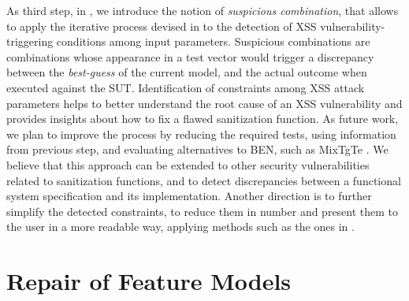 \begin{tikzborder}{\cite{Gargantini16:validation}}
\begin{tikzborder}{\cite{gargantini_combinatorial_2017}}
\begin{tikzborder}{\cite{garn2019}}
As third step, in \cite{garn2019}, we introduce the notion of \textit{suspicious combination}, that allows to apply the iterative process devised in \cite{gargantini_combinatorial_2017} to the detection of XSS vulnerability-triggering conditions among input parameters.
Suspicious combinations are combinations whose appearance in a test vector would trigger a discrepancy between the \textit{best-guess} of the current model, and the actual outcome when executed against the SUT.
Identification of constraints among XSS attack parameters helps to better understand
the root cause of an XSS vulnerability and provides insights about how to fix
a flawed sanitization function.
As future work, we plan to improve the process by reducing the required tests, using information from previous step, and evaluating alternatives to BEN, such as MixTgTe \cite{iwct19}. We believe that this approach can be extended to other security vulnerabilities related to sanitization functions, and to detect discrepancies between a functional system specification and its implementation.
Another direction is to further simplify the detected constraints, to reduce them in number and present them to the user in a more readable way, applying methods such as the ones in \cite{arcaini2019varivolution}.





\chapter{Repair of Feature Models}\label{ch:fmrepair}


\end{tikzborder}
\end{tikzborder}
\end{tikzborder}

